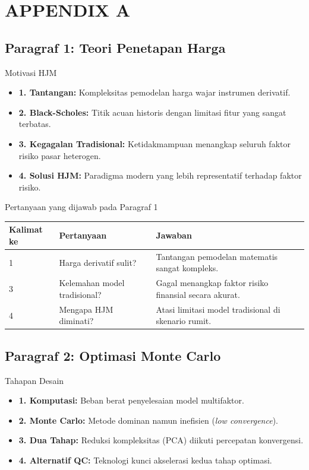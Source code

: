 \section{APPENDIX A}

\subsection{Paragraf 1: Teori Penetapan Harga}
\begin{frame}{Motivasi HJM}
    \begin{itemize}
        \item \textbf{1. Tantangan:} Kompleksitas pemodelan harga wajar instrumen derivatif.
        \item \textbf{2. Black-Scholes:} Titik acuan historis dengan limitasi fitur yang sangat terbatas.
        \item \textbf{3. Kegagalan Tradisional:} Ketidakmampuan menangkap seluruh faktor risiko pasar heterogen.
        \item \textbf{4. Solusi HJM:} Paradigma modern yang lebih representatif terhadap faktor risiko.
    \end{itemize}
\end{frame}

\begin{frame}{Pertanyaan yang dijawab pada Paragraf 1}
    \centering
    \small
    \begin{tabular}{lp{4.5cm}p{6cm}}
        \toprule
        Kalimat ke & Pertanyaan & Jawaban \\
        \midrule
        1 & Harga derivatif sulit? & Tantangan pemodelan matematis sangat kompleks. \\
        3 & Kelemahan model tradisional? & Gagal menangkap faktor risiko finansial secara akurat. \\
        4 & Mengapa HJM diminati? & Atasi limitasi model tradisional di skenario rumit. \\
        \bottomrule
    \end{tabular}
\end{frame}

\subsection{Paragraf 2: Optimasi Monte Carlo}
\begin{frame}{Tahapan Desain}
    \begin{itemize}
        \item \textbf{1. Komputasi:} Beban berat penyelesaian model multifaktor.
        \item \textbf{2. Monte Carlo:} Metode dominan namun inefisien (\textit{low convergence}).
        \item \textbf{3. Dua Tahap:} Reduksi kompleksitas (PCA) diikuti percepatan konvergensi.
        \item \textbf{4. Alternatif QC:} Teknologi kunci akselerasi kedua tahap optimasi.
    \end{itemize}
\end{frame}

